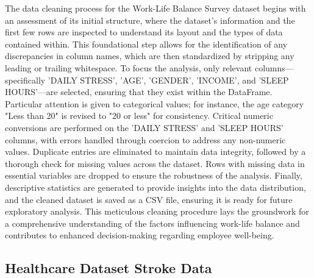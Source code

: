 \documentclass[runningheads]{llncs}
\begin{document}
\begin{enumerate}
The data cleaning process for the Work-Life Balance Survey dataset begins with an assessment of its initial structure, where the dataset's information and the first few rows are inspected to understand its layout and the types of data contained within. This foundational step allows for the identification of any discrepancies in column names, which are then standardized by stripping any leading or trailing whitespace. To focus the analysis, only relevant columns—specifically 'DAILY STRESS', 'AGE', 'GENDER', 'INCOME', and 'SLEEP HOURS'—are selected, ensuring that they exist within the DataFrame. Particular attention is given to categorical values; for instance, the age category "Less than 20" is revised to "20 or less" for consistency. Critical numeric conversions are performed on the 'DAILY STRESS' and 'SLEEP HOURS' columns, with errors handled through coercion to address any non-numeric values. Duplicate entries are eliminated to maintain data integrity, followed by a thorough check for missing values across the dataset. Rows with missing data in essential variables are dropped to ensure the robustness of the analysis. Finally, descriptive statistics are generated to provide insights into the data distribution, and the cleaned dataset is saved as a CSV file, ensuring it is ready for future exploratory analysis. This meticulous cleaning procedure lays the groundwork for a comprehensive understanding of the factors influencing work-life balance and contributes to enhanced decision-making regarding employee well-being.

\subsection{Healthcare Dataset Stroke Data}


\end{enumerate}
\end{document}
